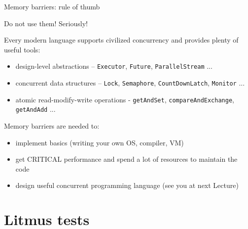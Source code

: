 \begin{frame}{Memory barriers: rule of thumb}

\pause
Do not use them! \pause Seriously!

\pause

Every modern language supports civilized concurrency and provides plenty of useful tools:
\begin{itemize}
    \pause
    \item design-level abstractions -- \texttt{Executor}, \texttt{Future}, \texttt{ParallelStream} ... 
    \pause
    \item concurrent data structures -- \texttt{Lock}, \texttt{Semaphore}, \texttt{CountDownLatch}, \texttt{Monitor} ...
    \pause
    \item atomic read-modify-write operations - \texttt{getAndSet}, \texttt{compareAndExchange}, \texttt{getAndAdd} ...
\end{itemize}

\pause

Memory barriers are needed to:
\begin{itemize}
    \item implement basics (writing your own OS, compiler, VM)
    \pause
    \item get CRITICAL performance \pause and spend a lot of resources to maintain the code
    \pause
    \item design useful concurrent programming language (see you at next Lecture)
\end{itemize}

\end{frame}

\section{Litmus tests}
\showTOC

